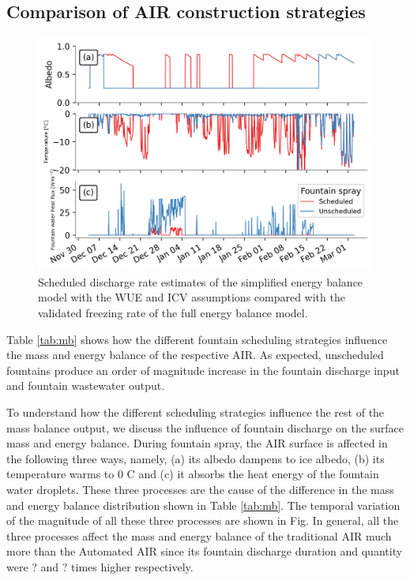 \documentclass[tc, manuscript]{copernicus}
\begin{document}
\subsection{Comparison of AIR construction strategies}

\begin{figure}[t]
\includegraphics[width=12cm]{Figures/dis_processes.png}
\caption{Scheduled discharge rate estimates of the simplified energy balance model with the WUE and ICV
assumptions compared with the validated freezing rate of the full energy balance model.}
\label{fig:freezing_rate}
\end{figure}

Table \ref{tab:mb} shows how the different fountain scheduling strategies influence the mass
and energy balance of the respective AIR. As expected, unscheduled fountains produce an order of magnitude
increase in the fountain discharge input and fountain wastewater output. 

To understand how the different scheduling strategies influence the rest of the mass balance output, we discuss
the influence of fountain discharge on the surface mass and energy balance. During fountain spray, the AIR
surface is affected in the following three ways, namely, (a) its albedo dampens to ice albedo, (b) its
temperature warms to 0 C and (c) it absorbs the heat energy of the fountain water droplets. These three
processes are the cause of the difference in the mass and energy balance distribution shown in Table
\ref{tab:mb}. The temporal variation of the magnitude of all these three processes are shown in Fig. In general,
all the three processes affect the mass and energy balance of the traditional AIR much more than the Automated
AIR since its fountain discharge duration and quantity were ? and ? times higher respectively. 
\end{document}
